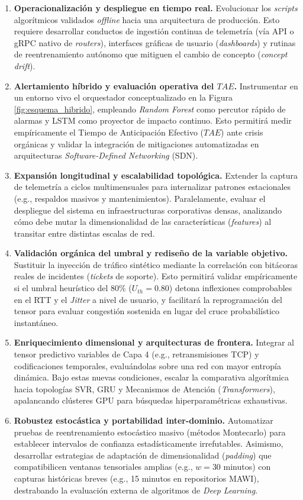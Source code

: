 \documentclass[12pt]{report}
\begin{document}
\begin{enumerate}
    \item \textbf{Operacionalización y despliegue en tiempo real.} Evolucionar los \textit{scripts} algorítmicos validados \textit{offline} hacia una arquitectura de producción. Esto requiere desarrollar conductos de ingestión continua de telemetría (vía API o gRPC nativo de \textit{routers}), interfaces gráficas de usuario (\textit{dashboards}) y rutinas de reentrenamiento autónomo que mitiguen el cambio de concepto (\textit{concept drift}).
    \item \textbf{Alertamiento híbrido y evaluación operativa del $TAE$.} Instrumentar en un entorno vivo el orquestador conceptualizado en la Figura \ref{fig:esquema_hibrido}, empleando \textit{Random Forest} como percutor rápido de alarmas y LSTM como proyector de impacto continuo. Esto permitirá medir empíricamente el Tiempo de Anticipación Efectivo ($TAE$) ante crisis orgánicas y validar la integración de mitigaciones automatizadas en arquitecturas \textit{Software-Defined Networking} (SDN).
    \item \textbf{Expansión longitudinal y escalabilidad topológica.} Extender la captura de telemetría a ciclos multimensuales para internalizar patrones estacionales (e.g., respaldos masivos y mantenimientos). Paralelamente, evaluar el despliegue del sistema en infraestructuras corporativas densas, analizando cómo debe mutar la dimensionalidad de las características (\textit{features}) al transitar entre distintas escalas de red.
    \item \textbf{Validación orgánica del umbral y rediseño de la variable objetivo.} Sustituir la inyección de tráfico sintético mediante la correlación con bitácoras reales de incidentes (\textit{tickets} de soporte). Esto permitirá validar empíricamente si el umbral heurístico del 80\% ($U_{th}=0.80$) detona inflexiones comprobables en el RTT y el \textit{Jitter} a nivel de usuario, y facilitará la reprogramación del tensor para evaluar congestión sostenida en lugar del cruce probabilístico instantáneo.
    \item \textbf{Enriquecimiento dimensional y arquitecturas de frontera.} Integrar al tensor predictivo variables de Capa 4 (e.g., retransmisiones TCP) y codificaciones temporales, evaluándolas sobre una red con mayor entropía dinámica. Bajo estas nuevas condiciones, escalar la comparativa algorítmica hacia topologías SVR, GRU y Mecanismos de Atención (\textit{Transformers}), apalancando clústeres GPU para búsquedas hiperparamétricas exhaustivas.
    \item \textbf{Robustez estocástica y portabilidad inter-dominio.} Automatizar pruebas de reentrenamiento estocástico masivo (métodos Montecarlo) para establecer intervalos de confianza estadísticamente irrefutables. Asimismo, desarrollar estrategias de adaptación de dimensionalidad (\textit{padding}) que compatibilicen ventanas tensoriales amplias (e.g., $w=30$ minutos) con capturas históricas breves (e.g., 15 minutos en repositorios MAWI), destrabando la evaluación externa de algoritmos de \textit{Deep Learning}.
\end{enumerate}
\end{document}
